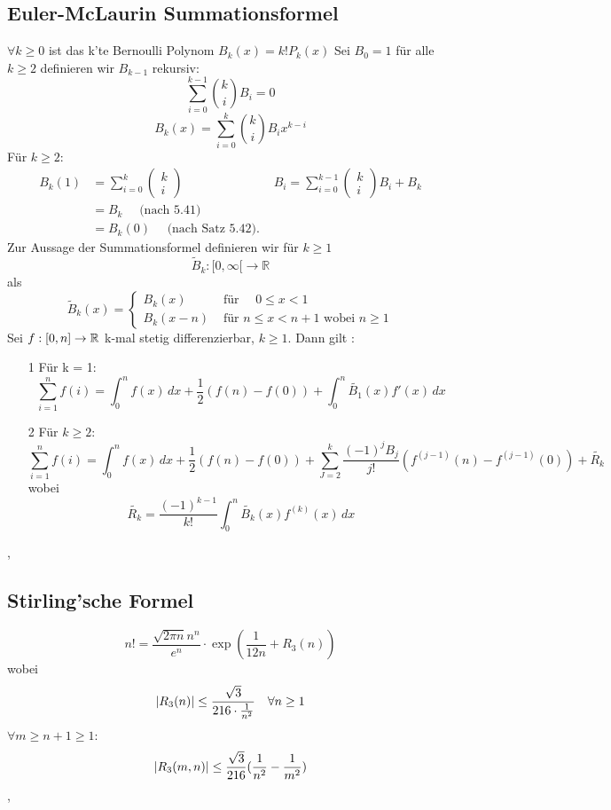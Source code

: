 \subsection{Euler-McLaurin Summationsformel}
 \( \forall k \geq 0 \) ist das k'te Bernoulli Polynom \(B_k(x) = k!P_k(x)\)
 Sei \(B_0 = 1\) für alle \( k \geq 2 \) definieren wir \(B_{k-1}\) rekursiv:
\[ \sum_{i=0}^{k-1} \binom{k}{i} B_i = 0\]
 \[ B_k(x) = \sum_{i=0}^{k} \binom{k}{i} B_ix^{k-i}\]
 Für \( k \geq 2\):
$$
\begin{aligned}
B_{k}(1) &=\sum_{i=0}^{k}\left(\begin{array}{l}
k \\
i
\end{array}\right) & B_{i}=\sum_{i=0}^{k-1}\left(\begin{array}{l}
k \\
i
\end{array}\right) B_{i}+B_{k} \\
&=B_{k} \quad \text { (nach 5.41) } \\
&=B_{k}(0) \quad \text { (nach Satz 5.42). }
\end{aligned}
$$
Zur Aussage der Summationsformel definieren wir für $k \geq 1$
$$
\widetilde{B}_{k}:[0, \infty[\longrightarrow \mathbb{R}
$$
als
$$
\widetilde{B}_{k}(x)=\left\{\begin{array}{ll}
B_{k}(x) & \text { für } \quad 0 \leq x<1 \\
B_{k}(x-n) & \text { für } n \leq x<n+1 \text { wobei } n \geq 1
\end{array}\right.
$$
 Sei \(f:[0,n] \rightarrow \mathbb{R} \) k-mal stetig differenzierbar, \(k \geq 1\). Dann gilt :
\begin{enumerate}
    \item [1] Für k = 1:
    \[ \sum_{i=1}^{n} f(i) = \int_{0}^{n} f(x) \,dx + \frac{1}{2} (f(n) - f(0)) + \int_{0}^{n} \tilde{B_1} (x) f'(x) \,dx \]
    \item [2] Für \( k \geq 2\):
    \[ \sum_{i=1}^{n}f(i) = \int_{0}^{n} f(x) \,dx + \frac{1}{2}(f(n) - f(0)) + \sum_{J=2}^{k} \frac{(-1)^jB_j}{j!}(f^{(j-1)}(n) - f^{(j-1)}(0)) + \tilde{R_k}\]
    wobei
    \[ \tilde{R_k} = \frac{(-1)^{k-1}}{k!} \int_{0}^{n} \tilde{B_k}(x)f^{(k)}(x) \,dx \]
\end{enumerate}
\sep
\subsection{Stirling'sche Formel}
 \[n! = \frac{\sqrt{2 \pi n} n^n}{e^n} \cdot \exp(\frac{1}{12n}+ R_3(n))\]
wobei
\[ \left\lvert R_3(n) \right\rvert \leq \frac{\sqrt{3}}{216 \cdot \frac{1}{n^2}} \quad \forall n \geq 1\]
 \( \forall m \geq n + 1 \geq 1\):
\[ \left\lvert R_3(m,n) \right\rvert \leq \frac{\sqrt{3}}{216}( \frac{1}{n^2} - \frac{1}{m^2})\]
\sep
